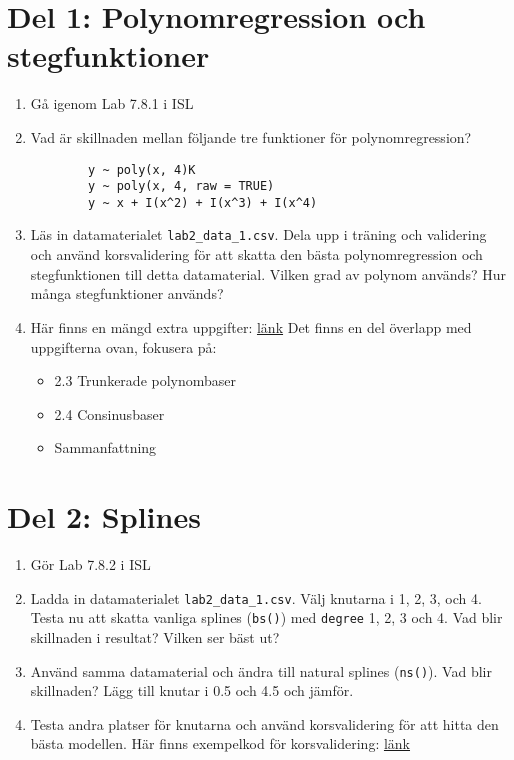 \documentclass[a4paper]{article}
\begin{document}
\section*{Del 1: Polynomregression och stegfunktioner}

\begin{enumerate}
    \item Gå igenom Lab 7.8.1 i ISL
    \item Vad är skillnaden mellan följande tre funktioner för polynomregression?
    \begin{verbatim}
        y ~ poly(x, 4)K
        y ~ poly(x, 4, raw = TRUE)
        y ~ x + I(x^2) + I(x^3) + I(x^4)
    \end{verbatim}
    \item Läs in datamaterialet \texttt{lab2\_data\_1.csv}. Dela upp i träning och validering och använd korsvalidering för att skatta den bästa polynomregression och stegfunktionen till detta datamaterial. Vilken grad av polynom används? Hur många stegfunktioner används?
    \item Här finns en mängd extra uppgifter: \href{https://raw.githubusercontent.com/STIMALiU/732G12_DM/master/labs/732G12_lab2_extra.pdf}{länk} Det finns en del överlapp med uppgifterna ovan, fokusera på:
     \begin{itemize}
       \item 2.3 Trunkerade polynombaser
       \item 2.4 Consinusbaser
       \item Sammanfattning
     \end{itemize}
    
\end{enumerate}

\section*{Del 2: Splines}

\begin{enumerate}
    \item Gör Lab 7.8.2 i ISL
    \item Ladda in datamaterialet \texttt{lab2\_data\_1.csv}. Välj knutarna i 1, 2, 3, och 4. Testa nu att skatta vanliga splines (\texttt{bs()}) med \texttt{degree} 1, 2, 3 och 4. Vad blir skillnaden i resultat? Vilken ser bäst ut?
    \item Använd samma datamaterial och ändra till natural splines (\texttt{ns()}). Vad blir skillnaden? Lägg till knutar i 0.5 och 4.5 och jämför.
    \item Testa andra platser för knutarna och använd korsvalidering för att hitta den bästa modellen. Här finns exempelkod för korsvalidering: \href{https://raw.githubusercontent.com/STIMALiU/732G12_DM/master/labs/lab2_cv_code1.R}{länk}
\end{enumerate}
\end{document}
